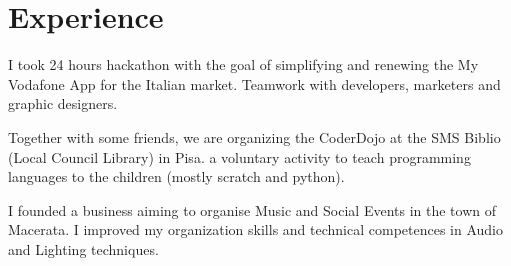 \documentclass[a4paper]{deedy-resume} %
\begin{document}
%
%
\begin{minipage}[t]{0.66\textwidth} %


\section{Experience}



I took 24 hours hackathon with the goal of simplifying and renewing the My Vodafone App for the Italian market. Teamwork with developers, marketers and graphic designers.

\sectionspace %




Together with some friends, we are organizing the CoderDojo at the SMS Biblio (Local Council Library) in Pisa. a voluntary activity to teach programming languages to the children (mostly scratch and python).

\sectionspace %



I founded a business aiming to organise Music and Social Events in the town of Macerata. I improved my organization skills and technical competences in Audio and Lighting techniques.


\end{minipage}
\end{document}
